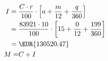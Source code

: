 	\begin{align*}
		I={}&\dfrac{C\cdot r}{100}\cdot\left[a+ \dfrac{m}{12}+\dfrac{q}{360}\right]\\
		={}&\dfrac{83921\cdot 10}{100}\cdot\left[15+ \dfrac{0}{12}+\dfrac{199}{360}\right]\\
		={}&\mbox{\EUR{130520.47}}\\
		M=&C+I\\
	\end{align*}
